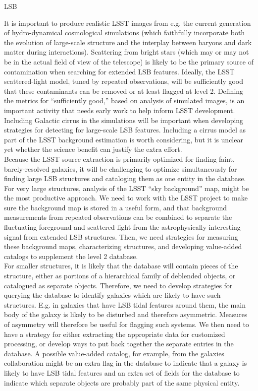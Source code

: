 \begin{tasklist}{LSB}
\begin{task}
{\begin{enumerate}
\end{enumerate}
It is important to produce realistic LSST images from e.g. the current generation of hydro-dynamical cosmological simulations (which faithfully incorporate both the evolution of large-scale structure and the interplay between baryons and dark matter during interactions). Scattering from bright stars (which may or may not be in the actual field of view of the  telescope) is likely to be the  primary source of contamination when searching  for extended  LSB features. Ideally,  the  LSST scattered-light model, tuned  by  repeated   observations, will be  sufficiently  good that these contaminants can be removed  or at  least flagged at  level 2.  Defining the metrics for “sufficiently good,” based on analysis of simulated images, is an important activity that needs early  work to  help inform  LSST development.
\\
Including  Galactic  cirrus  in the simulations will be important when developing strategies for detecting for large-scale  LSB features.   Including  a cirrus  model as part  of the  LSST background  estimation is worth  considering,  but  it is unclear  yet whether  the science benefit can justify the extra  effort.
\\
Because  the  LSST  source  extraction is primarily  optimized  for finding  faint,  barely-resolved  galaxies,  it  will  be challenging  to  optimize  simultaneously for finding large LSB structures and cataloging  them  as one entity  in the database. For very large structures, analysis of the LSST “sky background” map, might be the most productive approach. We need to work with the LSST project to make sure the background  map is stored in a useful form, and that background  measurements from repeated  observations can  be combined  to separate  the  fluctuating foreground  and  scattered light from the astrophysically interesting signal from extended  LSB structures. Then, we need strategies for measuring these background  maps,  characterizing structures,  and  developing value-added  catalogs  to supplement the level 2 database.
\\
For smaller structures, it is likely that the database will contain pieces of the structure, either as portions  of a hierarchical  family of deblended objects, or catalogued  as separate objects.  Therefore, we need to develop strategies for querying the database to identify galaxies which are likely to have such structures. E.g. in galaxies that have LSB tidal features around them, the main body of the galaxy is likely to be disturbed and therefore asymmetric. Measures of asymmetry will therefore be useful for flagging such systems. We then need to have a strategy for either extracting the appropriate data for customized  processing, or develop ways to put back together  the separate  entries  in the database. A possible value-added catalog, for example, from the galaxies collaboration might be an extra flag in the database to indicate that a galaxy is likely to have LSB tidal features and an extra  set of fields for the database to indicate  which separate objects are probably part of the same physical entity.
}
\end{task}
\end{tasklist}

